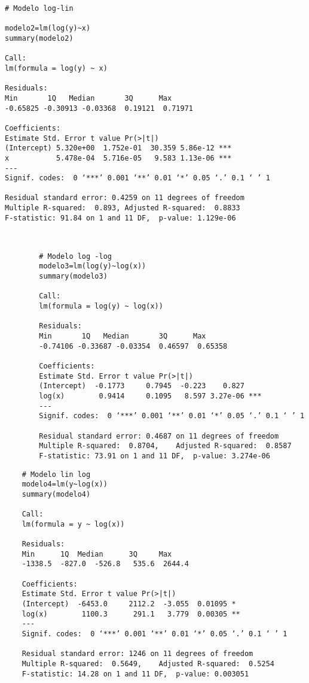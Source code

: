 \documentclass[base=hide,12pt]{elegantbook}
\begin{document}
\begin{Box3}{}
	\begin{verbatim}
# Modelo log-lin

modelo2=lm(log(y)~x)
summary(modelo2)

Call:
lm(formula = log(y) ~ x)

Residuals:
Min       1Q   Median       3Q      Max 
-0.65825 -0.30913 -0.03368  0.19121  0.71971 

Coefficients:
Estimate Std. Error t value Pr(>|t|)    
(Intercept) 5.320e+00  1.752e-01  30.359 5.86e-12 ***
x           5.478e-04  5.716e-05   9.583 1.13e-06 ***
---
Signif. codes:  0 ‘***’ 0.001 ‘**’ 0.01 ‘*’ 0.05 ‘.’ 0.1 ‘ ’ 1

Residual standard error: 0.4259 on 11 degrees of freedom
Multiple R-squared:  0.893,	Adjusted R-squared:  0.8833 
F-statistic: 91.84 on 1 and 11 DF,  p-value: 1.129e-06
		
		
	\end{verbatim}
\end{Box3}

\begin{Box3}{}
	\begin{verbatim}
		# Modelo log -log
		modelo3=lm(log(y)~log(x))
		summary(modelo3)
		
		Call:
		lm(formula = log(y) ~ log(x))
		
		Residuals:
		Min       1Q   Median       3Q      Max 
		-0.74106 -0.33687 -0.03354  0.46597  0.65358 
		
		Coefficients:
		Estimate Std. Error t value Pr(>|t|)    
		(Intercept)  -0.1773     0.7945  -0.223    0.827    
		log(x)        0.9414     0.1095   8.597 3.27e-06 ***
		---
		Signif. codes:  0 ‘***’ 0.001 ‘**’ 0.01 ‘*’ 0.05 ‘.’ 0.1 ‘ ’ 1
		
		Residual standard error: 0.4687 on 11 degrees of freedom
		Multiple R-squared:  0.8704,	Adjusted R-squared:  0.8587 
		F-statistic: 73.91 on 1 and 11 DF,  p-value: 3.274e-06
	\end{verbatim}
\end{Box3}

\begin{Box3}{}
	\begin{verbatim}
	# Modelo lin log
	modelo4=lm(y~log(x))
	summary(modelo4)	
	
	Call:
	lm(formula = y ~ log(x))
	
	Residuals:
	Min      1Q  Median      3Q     Max 
	-1338.5  -827.0  -526.8   535.6  2644.4 
	
	Coefficients:
	Estimate Std. Error t value Pr(>|t|)   
	(Intercept)  -6453.0     2112.2  -3.055  0.01095 * 
	log(x)        1100.3      291.1   3.779  0.00305 **
	---
	Signif. codes:  0 ‘***’ 0.001 ‘**’ 0.01 ‘*’ 0.05 ‘.’ 0.1 ‘ ’ 1
	
	Residual standard error: 1246 on 11 degrees of freedom
	Multiple R-squared:  0.5649,	Adjusted R-squared:  0.5254 
	F-statistic: 14.28 on 1 and 11 DF,  p-value: 0.003051
	
	\end{verbatim}
\end{Box3}
\end{document}
